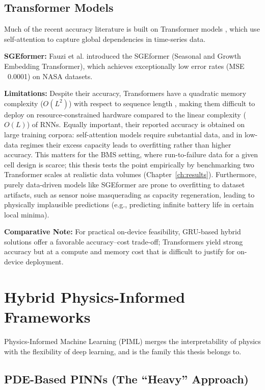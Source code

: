 \subsection{Transformer Models}

Much of the recent accuracy literature is built on Transformer models \cite{vaswani_attention}, which use self-attention to capture global dependencies in time-series data.

\textbf{SGEformer:} Fauzi et al. \cite{fauzi_sge} introduced the SGEformer (Seasonal and Growth Embedding Transformer), which achieves exceptionally low error rates (MSE ~0.0001) on NASA datasets.

\textbf{Limitations:} Despite their accuracy, Transformers have a quadratic memory complexity ($O(L^2)$) with respect to sequence length \cite{vaswani_attention}, making them difficult to deploy on resource-constrained hardware compared to the linear complexity ($O(L)$) of RNNs. Equally important, their reported accuracy is obtained on large training corpora: self-attention models require substantial data, and in low-data regimes their excess capacity leads to overfitting rather than higher accuracy. This matters for the BMS setting, where run-to-failure data for a given cell design is scarce; this thesis tests the point empirically by benchmarking two Transformer scales at realistic data volumes (Chapter~\ref{ch:results}). Furthermore, purely data-driven models like SGEformer are prone to overfitting to dataset artifacts, such as sensor noise masquerading as capacity regeneration, leading to physically implausible predictions (e.g., predicting infinite battery life in certain local minima).

\textbf{Comparative Note:} For practical on-device feasibility, GRU-based hybrid solutions offer a favorable accuracy--cost trade-off; Transformers yield strong accuracy but at a compute and memory cost that is difficult to justify for on-device deployment.

\section{Hybrid Physics-Informed Frameworks}

Physics-Informed Machine Learning (PIML) merges the interpretability of physics with the flexibility of deep learning, and is the family this thesis belongs to.

\subsection{PDE-Based PINNs (The ``Heavy'' Approach)}

